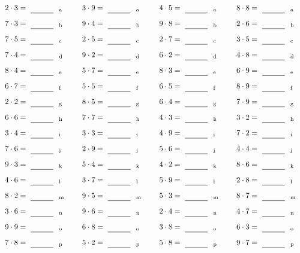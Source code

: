 \documentclass
[
  draft    = true,
  fontsize = 11pt,
  parskip  = half-
]
{scrartcl}
\begin{document}
\par\vfill\par
\begin{align*}
    \pline{2\cdot3}&=\rline{a}
  & \pline{3\cdot9}&=\rline{a}
  & \pline{4\cdot5}&=\rline{a}
  & \pline{8\cdot8}&=\rline{a} \\[1ex]
    \pline{7\cdot3}&=\rline{b}
  & \pline{9\cdot4}&=\rline{b}
  & \pline{9\cdot8}&=\rline{b}
  & \pline{2\cdot6}&=\rline{b} \\[1ex]
    \pline{7\cdot5}&=\rline{c}
  & \pline{2\cdot5}&=\rline{c}
  & \pline{2\cdot7}&=\rline{c}
  & \pline{3\cdot5}&=\rline{c} \\[1ex]
    \pline{7\cdot4}&=\rline{d}
  & \pline{9\cdot2}&=\rline{d}
  & \pline{6\cdot2}&=\rline{d}
  & \pline{4\cdot8}&=\rline{d} \\[1ex]
    \pline{8\cdot4}&=\rline{e}
  & \pline{5\cdot7}&=\rline{e}
  & \pline{8\cdot3}&=\rline{e}
  & \pline{6\cdot9}&=\rline{e} \\[1ex]
    \pline{6\cdot7}&=\rline{f}
  & \pline{5\cdot5}&=\rline{f}
  & \pline{6\cdot5}&=\rline{f}
  & \pline{8\cdot9}&=\rline{f} \\[1ex]
    \pline{2\cdot2}&=\rline{g}
  & \pline{8\cdot5}&=\rline{g}
  & \pline{6\cdot4}&=\rline{g}
  & \pline{7\cdot9}&=\rline{g} \\[1ex]
    \pline{6\cdot6}&=\rline{h}
  & \pline{7\cdot7}&=\rline{h}
  & \pline{4\cdot3}&=\rline{h}
  & \pline{3\cdot2}&=\rline{h} \\[1ex]
    \pline{3\cdot4}&=\rline{i}
  & \pline{3\cdot3}&=\rline{i}
  & \pline{4\cdot9}&=\rline{i}
  & \pline{7\cdot2}&=\rline{i} \\[1ex]
    \pline{7\cdot6}&=\rline{j}
  & \pline{2\cdot9}&=\rline{j}
  & \pline{5\cdot6}&=\rline{j}
  & \pline{4\cdot4}&=\rline{j} \\[1ex]
    \pline{9\cdot3}&=\rline{k}
  & \pline{5\cdot4}&=\rline{k}
  & \pline{4\cdot2}&=\rline{k}
  & \pline{8\cdot6}&=\rline{k} \\[1ex]
    \pline{4\cdot6}&=\rline{l}
  & \pline{3\cdot7}&=\rline{l}
  & \pline{5\cdot9}&=\rline{l}
  & \pline{2\cdot8}&=\rline{l} \\[1ex]
    \pline{8\cdot2}&=\rline{m}
  & \pline{9\cdot5}&=\rline{m}
  & \pline{5\cdot3}&=\rline{m}
  & \pline{8\cdot7}&=\rline{m} \\[1ex]
    \pline{3\cdot6}&=\rline{n}
  & \pline{9\cdot6}&=\rline{n}
  & \pline{2\cdot4}&=\rline{n}
  & \pline{4\cdot7}&=\rline{n} \\[1ex]
    \pline{9\cdot9}&=\rline{o}
  & \pline{6\cdot8}&=\rline{o}
  & \pline{3\cdot8}&=\rline{o}
  & \pline{6\cdot3}&=\rline{o} \\[1ex]
    \pline{7\cdot8}&=\rline{p}
  & \pline{5\cdot2}&=\rline{p}
  & \pline{5\cdot8}&=\rline{p}
  & \pline{9\cdot7}&=\rline{p}
\end{align*}
\end{document}
